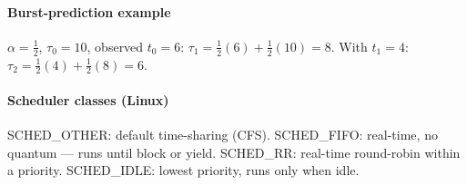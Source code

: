 \paragraph{Burst-prediction example}
$\alpha=\tfrac{1}{2}$, $\tau_0=10$, observed $t_0=6$: $\tau_1=\tfrac{1}{2}(6)+\tfrac{1}{2}(10)=8$. With $t_1=4$: $\tau_2=\tfrac{1}{2}(4)+\tfrac{1}{2}(8)=6$.

\paragraph{Scheduler classes (Linux)}
\textcolor{Bittersweet}{SCHED\_OTHER}: default time-sharing (CFS).
\textcolor{Bittersweet}{SCHED\_FIFO}: real-time, no quantum — runs until block or yield.
\textcolor{Bittersweet}{SCHED\_RR}: real-time round-robin within a priority.
\textcolor{Bittersweet}{SCHED\_IDLE}: lowest priority, runs only when idle.
